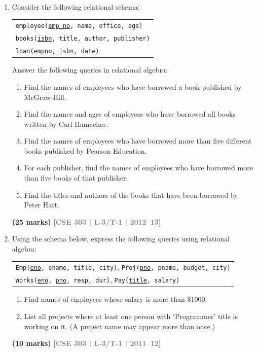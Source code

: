 \documentclass[12pt,a3paper]{article}
\newcommand{\yr}[1]{\hfill\textcolor{gray}{\small\textbf{[#1]}}}
\newcommand{\mk}[1]{\textcolor{orange!70!black}{\small\textbf{(#1 marks)}}}
\begin{document}
\begin{enumerate}
\item Consider the following relational schema:
\begin{center}
\begin{tabular}{l}
\texttt{employee(\underline{emp\_no}, name, office, age)}\\
\texttt{books(\underline{isbn}, title, author, publisher)}\\
\texttt{loan(\underline{empno}, \underline{isbn}, date)}
\end{tabular}
\end{center}
Answer the following queries in relational algebra:
\begin{enumerate}
  \item Find the names of employees who have borrowed a book published by McGraw-Hill.
  \item Find the names and ages of employees who have borrowed all books written by Carl Hamacher.
  \item Find the names of employees who have borrowed more than five different books published by Pearson Education.
  \item For each publisher, find the names of employees who have borrowed more than five books of that publisher.
  \item Find the titles and authors of the books that have been borrowed by Peter Hart.
\end{enumerate}
\mk{25} \yr{CSE 303 | L-3/T-1 | 2012--13}

\item Using the schema below, express the following queries using relational algebra:
\begin{center}
\begin{tabular}{l}
\texttt{Emp(\underline{eno}, ename, title, city)},\quad
\texttt{Proj(\underline{pno}, pname, budget, city)}\\
\texttt{Works(\underline{eno}, \underline{pno}, resp, dur)},\quad
\texttt{Pay(\underline{title}, salary)}
\end{tabular}
\end{center}
\begin{enumerate}
  \item Find names of employees whose salary is more than \$1000.
  \item List all projects where at least one person with `Programmer' title is working on it. (A project name may appear more than once.)
\end{enumerate}
\mk{10} \yr{CSE 303 | L-3/T-1 | 2011--12}


\end{enumerate}
\end{document}
